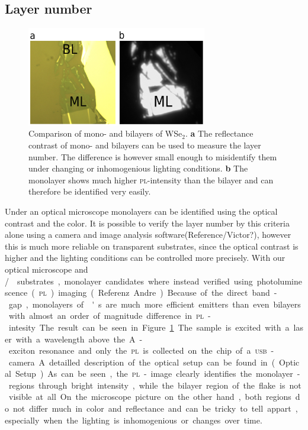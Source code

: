 \subsection{Layer number}

\begin{figure}
	\centering
	\includegraphics[width=0.7\textwidth]{PL_Contrast_comparison.png}
	\caption{Comparison of mono- and bilayers of WSe$_2$. \textbf{a} The reflectance contrast of mono- and bilayers can be used to measure the layer number. The difference is however small enough to misidentify them under changing or inhomogenious lighting conditions. \textbf{b} The monolayer shows much higher \textsc{pl}-intensity than the bilayer and can therefore be identified very easily.}
	\label{pl-contrast}
\end{figure}

Under an optical microscope monolayers can be identified using the optical contrast and the color. It is possible to verify the layer number by this criteria alone using a camera and image analysis software(Reference/Victor?), however this is much more reliable on transparent substrates, since the optical contrast is higher and the lighting conditions can be controlled more precisely. With our optical microscope and \si/\sio substrates, monolayer candidates where instead verified using photoluminescence (\textsc{pl}) imaging(Referenz Andre). Because of the direct band-gap, monolayers of \tmd's are much more efficient emitters than even bilayers with almost an order of magnitude difference in \textsc{pl}-intesity. The result can be seen in Figure \ref{pl-contrast}. The sample is excited with a laser with a wavelength above the A-exciton resonance and only the \textsc{pl} is collected on the chip of a \textsc{usb}-camera. A detailled description of the optical setup can be found in (Optical Setup). As can be seen, the \textsc{pl}-image clearly identifies the monolayer-regions through bright intensity, while the bilayer region of the flake is not visible at all. On the microscope picture on the other hand, both regions do not differ much in color and reflectance and can be tricky to tell appart, especially when the lighting is inhomogenious or changes over time.

